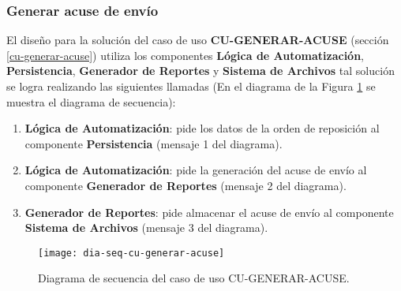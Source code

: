 \subsubsection{Generar acuse de envío}
El diseño para la solución del caso de uso \textbf{CU-GENERAR-ACUSE} (sección \ref{cu-generar-acuse}) utiliza los componentes \textbf{Lógica de Automatización}, \textbf{Persistencia}, \textbf{Generador de Reportes} y \textbf{Sistema de Archivos} tal solución se logra realizando las siguientes llamadas (En el diagrama de la Figura \ref{fig:dia-seq-cu-generar-acuse} se muestra el diagrama de secuencia):
\begin{enumerate}
	\item \textbf{Lógica de Automatización}: pide los datos de la orden de reposición al componente \textbf{Persistencia} (mensaje 1 del diagrama).
	\item \textbf{Lógica de Automatización}: pide la generación del acuse de envío al componente \textbf{Generador de Reportes} (mensaje 2 del diagrama).
	\item \textbf{Generador de Reportes}: pide almacenar el acuse de envío al componente \textbf{Sistema de Archivos} (mensaje 3 del diagrama).
\end{enumerate}

\begin{figure}[h]
	\centering
	\texttt{[image: dia-seq-cu-generar-acuse]}
	\caption{Diagrama de secuencia del caso de uso CU-GENERAR-ACUSE.}
	\label{fig:dia-seq-cu-generar-acuse}
\end{figure}

